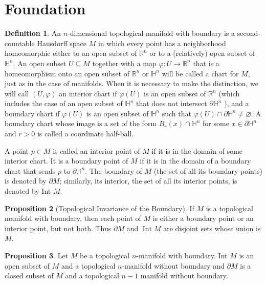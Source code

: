 \documentclass[12pt,a4paper]{book}
\theoremstyle{definition}
\newtheorem{defn}{Definition}[section]
\newtheorem{prop}[defn]{Proposition}
\begin{document}
\section{Foundation}
\begin{defn}
    An $n$-dimensional topological manifold with boundary is a
    second-countable Hausdorff space $M$ in which every point has a neighborhood homeomorphic
    either to an open subset of $\mathbb{R}^n$ or to a (relatively)
    open subset of $\mathbb{H}^n$.
    An open subset $U \subseteq M$ together with a map $\varphi: U \rightarrow \mathbb{R}^n$ that is a homeomorphism onto
    an open subset of $\mathbb{R}^n$ or $\mathbb{H}^n$ will be called a chart for $M$,
    just as in the case of manifolds. When it is necessary to make the distinction, we will call $(U, \varphi)$ an interior chart if $\varphi(U)$ is an open subset of $\mathbb{R}^n$ (which includes the case of an open subset of $\mathbb{H}^n$ that does not intersect $\partial \mathbb{H}^n$ ), and a boundary chart if $\varphi(U)$ is an open subset of $\mathbb{H}^n$ such that $\varphi(U) \cap \partial \mathbb{H}^n \neq \varnothing$. A boundary chart whose image is a set of the form $B_r(x) \cap \mathbb{H}^n$ for some $x \in \partial \mathbb{H}^n$ and $r>0$ is called a coordinate half-ball.

    A point $p \in M$ is called an interior point of $M$ if it is in the domain of some interior chart. It is a boundary point of $M$ if it is in the domain of a boundary chart that sends $p$ to $\partial \mathbb{H}^n$. The boundary of $M$ (the set of all its boundary points) is denoted by $\partial M$; similarly, its interior, the set of all its interior points, is denoted by Int $M$.
\end{defn}
\begin{prop}[Topological Invariance of the Boundary]
    If $M$ is a topological manifold with boundary, then each point of $M$ is either a boundary point or an interior point, but not both. Thus $\partial M$ and $\operatorname{Int} M$ are disjoint sets whose union is $M$.
\end{prop}
\begin{prop}
    Let $M$ be a topological $n$-manifold with boundary.
    Int $M$ is an open subset of $M$ and a topological
    $n$-manifold without boundary and $\partial M$ is a closed subset of $M$ and a topological $n-1$ manifold without boundary.
\end{prop}
\end{document}
